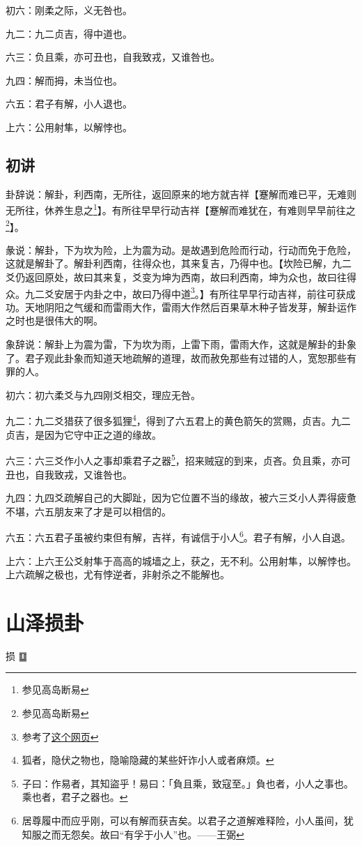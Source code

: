 \documentclass[12pt,oneside]{book}
\begin{document}
初六：刚柔之际，义无咎也。

九二：九二贞吉，得中道也。

六三：负且乘，亦可丑也，自我致戎，又谁咎也。

九四：解而拇，未当位也。

六五：君子有解，小人退也。

上六：公用射隼，以解悖也。

\section{初讲}
卦辞说：解卦，利西南，无所往，返回原来的地方就吉祥【蹇解而难已平，无难则无所往，休养生息之\footnote{参见高岛断易}】。有所往早早行动吉祥【蹇解而难犹在，有难则早早前往之\footnote{参见高岛断易}】。

彖说：解卦，下为坎为险，上为震为动。是故遇到危险而行动，行动而免于危险，这就是解卦了。解卦利西南，往得众也，其来复吉，乃得中也。【坎险已解，九二爻仍返回原处，故曰其来复，爻变为坤为西南，故曰利西南，坤为众也，故曰往得众。九二爻安居于内卦之中，故曰乃得中道\footnote{参考了\href{https://www.eee-learning.com/book/neweee40}{这个网页}}。】有所往早早行动吉祥，前往可获成功。天地阴阳之气缓和而雷雨大作，雷雨大作然后百果草木种子皆发芽，解卦运作之时也是很伟大的啊。

象辞说：解卦上为震为雷，下为坎为雨，上雷下雨，雷雨大作，这就是解卦的卦象了。君子观此卦象而知道天地疏解的道理，故而赦免那些有过错的人，宽恕那些有罪的人。


初六：初六柔爻与九四刚爻相交，理应无咎。

九二：九二爻猎获了很多狐狸\footnote{狐者，隐伏之物也，隐喻隐藏的某些奸诈小人或者麻烦。}，得到了六五君上的黄色箭矢的赏赐，贞吉。九二贞吉，是因为它守中正之道的缘故。

六三：六三爻作小人之事却乘君子之器\footnote{子曰：作易者，其知盜乎！易曰：「負且乘，致寇至。」負也者，小人之事也。乘也者，君子之器也。}，招来贼寇的到来，贞吝。负且乘，亦可丑也，自我致戎，又谁咎也。

九四：九四爻疏解自己的大脚趾，因为它位置不当的缘故，被六三爻小人弄得疲惫不堪，六五朋友来了才是可以相信的。

六五：六五君子虽被约束但有解，吉祥，有诚信于小人\footnote{居尊履中而应乎刚，可以有解而获吉矣。以君子之道解难释险，小人虽间，犹知服之而无怨矣。故曰“有孚于小人”也。——王弼}。君子有解，小人自退。

上六：上六王公爻射隼于高高的城墙之上，获之，无不利。公用射隼，以解悖也。上六疏解之极也，尤有悖逆者，非射杀之不能解也。


\chapter{山泽损卦}
损 {\Large ䷨}
\end{document}
